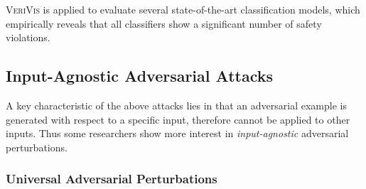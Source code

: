 %
\textsc{VeriVis} is applied to evaluate several state-of-the-art classification models, which empirically reveals that all classifiers show a significant number of safety violations. %



\subsection{Input-Agnostic Adversarial Attacks}\label{sec:inputAgnosticAdvAttacks}

A key characteristic of the above attacks lies in that an adversarial example is generated with respect to a specific input, therefore cannot be applied to other inputs. Thus some researchers show more interest in \emph{input-agnostic} adversarial perturbations.




\subsubsection{Universal Adversarial Perturbations}

